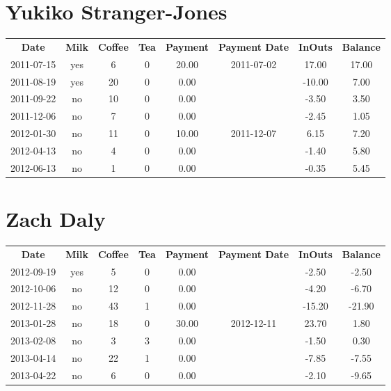 \section{Yukiko Stranger-Jones}

\begin{center}
\begin{tabular}{cccccccc}
\textbf{Date} & \textbf{Milk} & \textbf{Coffee} & \textbf{Tea} & \textbf{Payment} & \textbf{Payment Date} & \textbf{InOuts} & \textbf{Balance} \\
2011-07-15 & yes &  6 & 0 & 20.00 & 2011-07-02 &  17.00 & 17.00\\ 
2011-08-19 & yes & 20 & 0 &  0.00 &  & -10.00 &  7.00\\ 
2011-09-22 & no & 10 & 0 &  0.00 &  &  -3.50 &  3.50\\ 
2011-12-06 & no &  7 & 0 &  0.00 &  &  -2.45 &  1.05\\ 
2012-01-30 & no & 11 & 0 & 10.00 & 2011-12-07 &   6.15 &  7.20\\ 
2012-04-13 & no &  4 & 0 &  0.00 &  &  -1.40 &  5.80\\ 
2012-06-13 & no &  1 & 0 &  0.00 &  &  -0.35 &  5.45
\end{tabular}
\end{center}

\section{Zach Daly}

\begin{center}
\begin{tabular}{cccccccc}
\textbf{Date} & \textbf{Milk} & \textbf{Coffee} & \textbf{Tea} & \textbf{Payment} & \textbf{Payment Date} & \textbf{InOuts} & \textbf{Balance} \\
2012-09-19 & yes &  5 & 0 &  0.00 &  &  -2.50 &  -2.50\\ 
2012-10-06 & no & 12 & 0 &  0.00 &  &  -4.20 &  -6.70\\ 
2012-11-28 & no & 43 & 1 &  0.00 &  & -15.20 & -21.90\\ 
2013-01-28 & no & 18 & 0 & 30.00 & 2012-12-11 &  23.70 &   1.80\\ 
2013-02-08 & no &  3 & 3 &  0.00 &  &  -1.50 &   0.30\\ 
2013-04-14 & no & 22 & 1 &  0.00 &  &  -7.85 &  -7.55\\ 
2013-04-22 & no &  6 & 0 &  0.00 &  &  -2.10 &  -9.65
\end{tabular}
\end{center}

